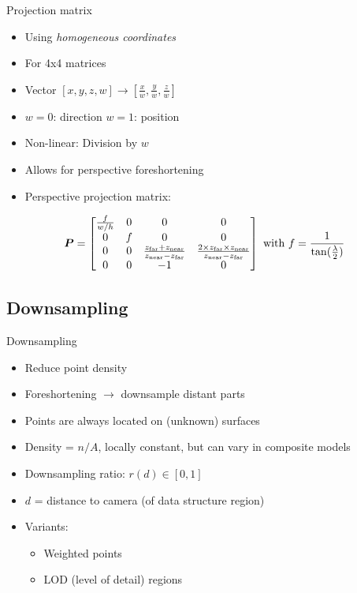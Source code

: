 \documentclass{beamer}
\begin{document}
\begin{frame}{Projection matrix}
	\begin{itemize}
	\item Using \emph{homogeneous coordinates}
	\item For 4x4 matrices
	\item Vector $[x, y, z, w] \rightarrow [\frac{x}{w}, \frac{y}{w}, \frac{z}{w}]$
	\item $w = 0$: direction \quad \quad $w = 1$: position
	\item Non-linear: Division by $w$
	\item Allows for perspective foreshortening
	\item Perspective projection matrix:
	\end{itemize}
	\begin{displaymath}
	\matrixsym{P} = \begin{bmatrix}
	\frac{f}{w/h} & 0 & 0 & 0 \\
	0 & f & 0 & 0 \\
	0 & 0 & \frac{z_{\mathrm{far}} + z_{\mathrm{near}}}{z_{\mathrm{near}} - z_{\mathrm{far}}} & \frac{2 \times z_{\mathrm{far}} \times z_{\mathrm{near}}}{z_{\mathrm{near}} - z_{\mathrm{far}}} \\
	0 & 0 & -1 & 0
	\end{bmatrix}
	\text{ with }
	f = \frac{1}{\tan(\frac{\lambda}{2})}
	\end{displaymath}
\end{frame}


\subsection{Downsampling}

\begin{frame}{Downsampling}
	\begin{itemize}
	\item Reduce point density
	\item Foreshortening $\rightarrow$ downsample distant parts
	\item Points are always located on (unknown) surfaces
	\item Density = $n/A$, locally constant, but can vary in composite models
	\item Downsampling ratio: $r(d) \in [0,1]$
	\item $d$ = distance to camera (of data structure region)
	\item Variants:
		\begin{itemize}
		\item Weighted points
		\item LOD (level of detail) regions
		\end{itemize}
	\end{itemize}
\end{frame}
\end{document}
